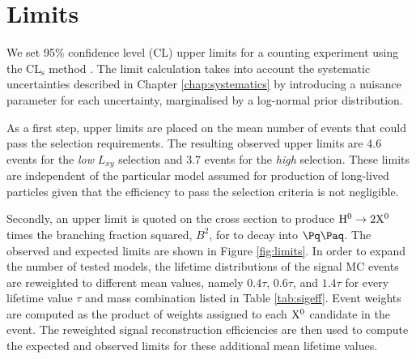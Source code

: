 \section{Limits}
\label{sec:limits}

We set 95\% confidence level
(CL) upper limits for a counting experiment
using the CL$_\mathrm{s}$ method \cite{Read:2002hq, Junk:1999kv}. The limit calculation
takes into account the systematic uncertainties described in Chapter 
\ref{chap:systematics} by introducing
a nuisance parameter for each uncertainty, marginalised by a log-normal prior distribution.

As a first step, upper limits are placed on the mean number of events that could pass
the selection requirements. The resulting observed upper limits are 4.6 events
for the {\it low} $L_{xy}$ selection and 3.7 events for the {\it high} selection.
 These limits are independent
of the particular model assumed for production of long-lived particles given
that the efficiency to pass the selection criteria is not negligible. 


Secondly, an upper limit is quoted on the cross section
to produce $\mathrm{H}^{0} \to 2\mathrm{X^{0}}$ times the branching fraction squared, $B^2$, for \X to decay into $\qq$.
The observed and
expected limits are shown in Figure \ref{fig:limits}. In order to expand the number of tested models,
the lifetime distributions of the signal MC events are reweighted to
different mean values, namely $0.4\tau$, $0.6\tau$, and $1.4\tau$ for every
lifetime value $\tau$ and mass combination listed
in Table \ref{tab:sigeff}.
Event weights are computed as the product
 of weights assigned to each $\mathrm{X^{0}}$ candidate in the event.
The reweighted signal reconstruction efficiencies are then used
to compute the expected and observed limits for these additional mean lifetime values.

